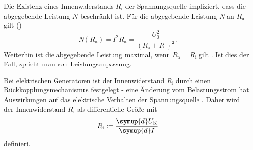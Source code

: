 Die Existenz eines Innenwiderstands $R_{\text{i}}$ der Spannungsquelle impliziert, dass die abgegebende Leistung $N$ beschränkt ist.
Für die abgegebende Leistung $N$ an $R_{\text{a}}$ gilt (\cite{demi})
\begin{equation}
	N(R_{\text{a}}) = I^2 R_{\text{a}} = \frac{U_0^2}{(R_{\text{a}} + R_{\text{i}})^2} \text{.} 
\end{equation}
Weiterhin ist die abgegebende Leistung maximal, wenn $R_{\text{a}} = R_{\text{i}}$ gilt \cite{demi}.
Ist dies der Fall, spricht man von Leistungsanpassung.

Bei elektrischen Generatoren ist der Innenwiderstand $R_{\text{i}}$ durch einen Rückkopplungsmechanismus festgelegt - eine Änderung vom Belastungsstrom hat Auswirkungen auf das elektrische Verhalten der Spannungsquelle \cite{Anleitung}. Daher wird der Innenwiderstand $R_{\text{i}}$ als differentielle Größe mit 
\begin{equation}
	R_{\text{i}} := \frac{\symup{d}U_{\text{K}}}{\symup{d}I}
\end{equation}
definiert.
